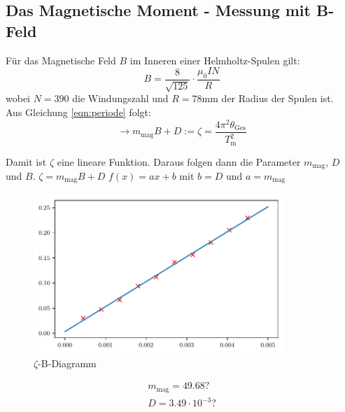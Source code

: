 \subsection{Das Magnetische Moment - Messung mit B-Feld}

Für das Magnetische Feld $B$ im Inneren einer Helmholtz-Spulen gilt:
\begin{equation}
    B= \frac{8}{\sqrt{125}} \cdot \frac{\mu_0 I N}{R}
\end{equation}
wobei $N=390$ die Windungszahl und $R=78$mm der Radius der Spulen ist.\\
Aus Gleichung \ref{eqn:periode}
folgt:
\begin{equation}
    \to m_\text{mag}B+D := \zeta = \frac{4\pi^2\theta_\text{Ges}}{T^2_\text{m}}
\end{equation}

Damit ist $\zeta$ eine lineare Funktion. Daraus folgen dann die Parameter $m_\text{mag}$, $D$ und $B$.\newline
$\zeta = m_\text{mag}B + D$ \to $f(x)=ax+b$ mit $b = D$ und $a=m_\text{mag}$

\begin{figure}[h]
    \centering
    \includegraphics[width=0.85\textwidth, height=0.5\textwidth]{build/plot.pdf}
    \caption{$\zeta$-B-Diagramm}        
    \label{fig:Diagramm}
\end{figure}


\begin{gather}
    m_\text{mag} = 49.68 \mathrm{ ?}\\
    D = 3.49\cdot10^{-3} \mathrm{ ?}\\
\end{gather}

